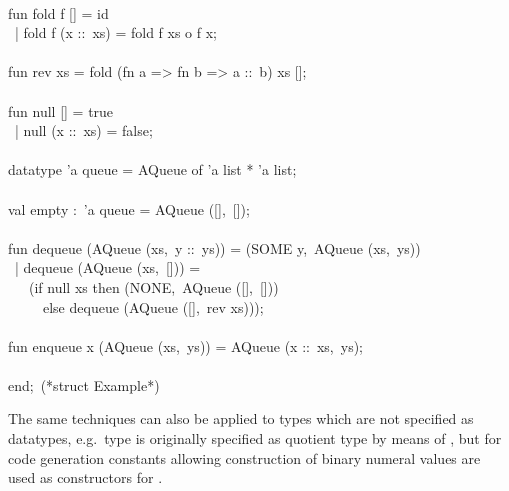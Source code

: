 \begin{isabellebody}
\begin{isamarkuptext}
\hspace*{0pt}\\
\hspace*{0pt}fun fold f [] = id\\
\hspace*{0pt} ~| fold f (x ::~xs) = fold f xs o f x;\\
\hspace*{0pt}\\
\hspace*{0pt}fun rev xs = fold (fn a => fn b => a ::~b) xs [];\\
\hspace*{0pt}\\
\hspace*{0pt}fun null [] = true\\
\hspace*{0pt} ~| null (x ::~xs) = false;\\
\hspace*{0pt}\\
\hspace*{0pt}datatype 'a queue = AQueue of 'a list * 'a list;\\
\hspace*{0pt}\\
\hspace*{0pt}val empty :~'a queue = AQueue ([],~[]);\\
\hspace*{0pt}\\
\hspace*{0pt}fun dequeue (AQueue (xs,~y ::~ys)) = (SOME y,~AQueue (xs,~ys))\\
\hspace*{0pt} ~| dequeue (AQueue (xs,~[])) =\\
\hspace*{0pt} ~~~(if null xs then (NONE,~AQueue ([],~[]))\\
\hspace*{0pt} ~~~~~else dequeue (AQueue ([],~rev xs)));\\
\hspace*{0pt}\\
\hspace*{0pt}fun enqueue x (AQueue (xs,~ys)) = AQueue (x ::~xs,~ys);\\
\hspace*{0pt}\\
\hspace*{0pt}end;~(*struct Example*)%
\end{isamarkuptext}%
\isamarkuptrue%
%
\endisatagquote
{\isafoldquote}%
%
\isadelimquote
%
\endisadelimquote
%
\begin{isamarkuptext}%
The same techniques can also be applied to types which are not
  specified as datatypes, e.g.~type  is originally specified
  as quotient type by means of \hyperlink{command.typedef}{\mbox{}}, but for code
  generation constants allowing construction of binary numeral values
  are used as constructors for .


\end{isamarkuptext}
\end{isabellebody}
